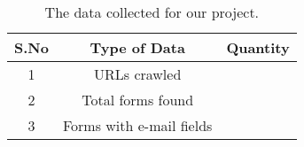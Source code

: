 \begin{table}[!htbp]
	\centering
	\begin{tabular}{|c|c|c|}
		\hline
		\multicolumn{1}{|c|}{\textbf{S.No}} &
		\multicolumn{1}{c|}{\textbf{Type of Data}} &
		\multicolumn{1}{c|}{\textbf{Quantity}}\\
		\hline
		1 & URLs crawled & \urls \\
		\hline
		2 & Total forms found & \forms \\
		\hline
		3 & Forms with e-mail fields & \emailforms \\
		\hline
	\end{tabular}
	\caption[]{The data collected for our project.}
	\label{tab:data}
\end{table}